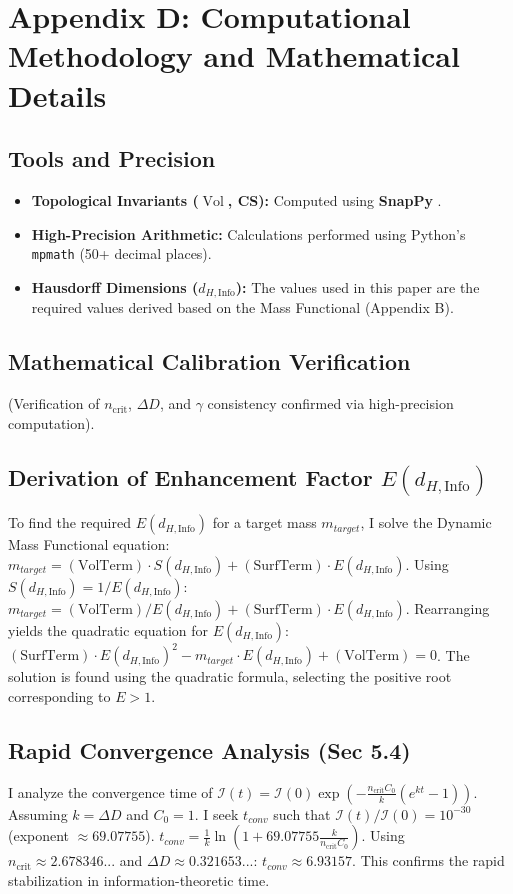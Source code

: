\documentclass[11pt, a4paper]{article}
\theoremstyle{definition}
\theoremstyle{definition}
\newcommand{\Ical}{\mathcal{I}}
\newcommand{\Vol}{\operatorname{Vol}}
\newcommand{\dHInfo}{d_{H,\mathrm{Info}}} %
\newcommand{\ncrit}{n_{\mathrm{crit}}}
\begin{document}
\section{Appendix D: Computational Methodology and Mathematical Details}

\subsection{Tools and Precision}
\begin{itemize}
    \item \textbf{Topological Invariants ($\Vol$, CS):} Computed using \textbf{SnapPy} \cite{Culler2020}.
    \item \textbf{High-Precision Arithmetic:} Calculations performed using Python's \texttt{mpmath} (50+ decimal places).
    \item \textbf{Hausdorff Dimensions ($\dHInfo$):} The values used in this paper are the required values derived based on the Mass Functional (Appendix B).
\end{itemize}

\subsection{Mathematical Calibration Verification}
(Verification of $\ncrit$, $\Delta D$, and $\gamma$ consistency confirmed via high-precision computation).

\subsection{Derivation of Enhancement Factor \texorpdfstring{$E(\dHInfo)$}{E(dHInfo)}}
\label{app:DerivationE}
To find the required $E(\dHInfo)$ for a target mass $m_{target}$, I solve the Dynamic Mass Functional equation:
$m_{target} = (\text{VolTerm}) \cdot S(\dHInfo) + (\text{SurfTerm}) \cdot E(\dHInfo)$.
Using $S(\dHInfo) = 1/E(\dHInfo)$:
$m_{target} = (\text{VolTerm}) / E(\dHInfo) + (\text{SurfTerm}) \cdot E(\dHInfo)$.
Rearranging yields the quadratic equation for $E(\dHInfo)$:
$(\text{SurfTerm}) \cdot E(\dHInfo)^2 - m_{target} \cdot E(\dHInfo) + (\text{VolTerm}) = 0$.
The solution is found using the quadratic formula, selecting the positive root corresponding to $E>1$.

\subsection{Rapid Convergence Analysis (Sec 5.4)}
\label{app:RapidConvergence}
I analyze the convergence time of $\Ical(t) = \Ical(0) \exp\left( - \frac{\ncrit C_0}{k} (e^{k t} - 1) \right)$.
Assuming $k=\Delta D$ and $C_0=1$. I seek $t_{conv}$ such that $\Ical(t)/\Ical(0) = 10^{-30}$ (exponent $\approx 69.07755$).
$t_{conv} = \frac{1}{k} \ln\left( 1 + 69.07755 \frac{k}{\ncrit C_0} \right)$.
Using $\ncrit \approx 2.678346...$ and $\Delta D \approx 0.321653...$:
$t_{conv} \approx 6.93157$. This confirms the rapid stabilization in information-theoretic time.
\end{document}
